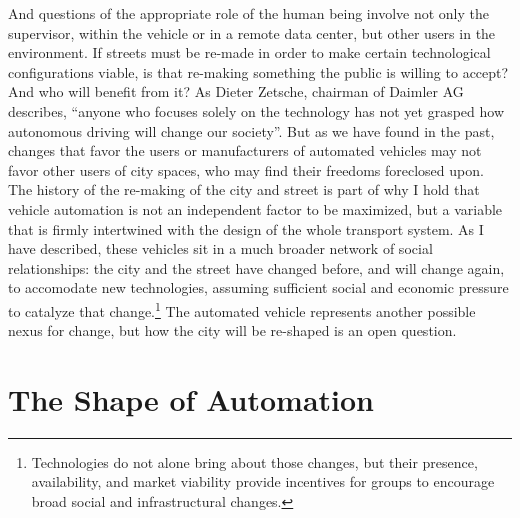 
And questions of the appropriate role of the human being involve not
only the supervisor, within the vehicle or in a remote data center,
but other users in the environment. If streets must be re-made in
order to make certain technological configurations viable, is that
re-making something the public is willing to accept? And who will
benefit from it? As Dieter Zetsche, chairman of Daimler AG describes,
``anyone who focuses solely on the technology has not yet grasped how 
autonomous driving will change our
society''\cite{???-http://www.slashgear.com/how-mercedes-f-015-self-driving-car-is-shaping-smart-cities-20374602/}.
But as we have found in the past, changes that favor the users or
manufacturers of automated vehicles may not favor other users of city
spaces, who may find their freedoms foreclosed upon. The history of
the re-making of the city and street is part of why I hold that
vehicle automation is not an 
independent factor to be maximized, but a variable that is firmly
intertwined with the design of the whole transport system.
As I have described, these vehicles sit in a much broader network of
social relationships: the city and the street have changed before, and
will change again, to accomodate new technologies, assuming sufficient
social and economic pressure to catalyze that change.\footnote{Technologies do
not alone bring about those changes, but their presence, availability,
and market viability provide incentives for groups to encourage broad
social and infrastructural changes.} The automated vehicle represents
another possible nexus for change, but how the city will be re-shaped
is an open question. 


\section{The Shape of Automation}

